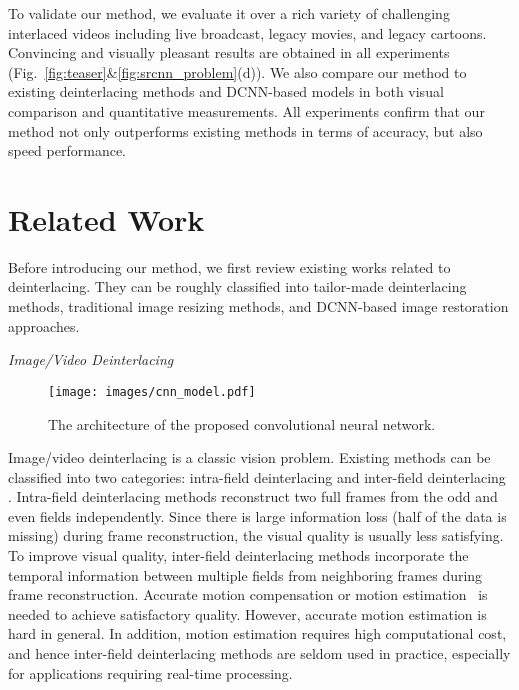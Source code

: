 \documentclass[acmtog]{acmart}
\begin{document}
To validate our method, we evaluate it over a rich
variety of challenging interlaced videos including live broadcast, legacy movies,
and legacy cartoons. Convincing and visually pleasant results are obtained in all experiments 
(Fig.~\ref{fig:teaser}\&\ref{fig:srcnn_problem}(d)). We also compare our
method to existing deinterlacing methods and DCNN-based models in both visual comparison and quantitative
measurements. All experiments confirm that our method not
only outperforms existing methods in terms of accuracy, but also
speed performance. 

\section{Related Work}
Before introducing our method, we first review existing works related to 
deinterlacing. They can be roughly classified into tailor-made 
deinterlacing methods,  traditional image resizing methods, and DCNN-based
image restoration approaches.

\vspace{0.15in}\noindent\emph{Image/Video Deinterlacing}\,\,\,\,\begin{figure*}[!tp]
  \texttt{[image: images/cnn\_model.pdf]}\\
  \caption{The architecture of the proposed convolutional neural network.}\label{fig:cnn_model}
\end{figure*}
Image/video deinterlacing is a classic  vision problem. 
Existing methods can be classified into two categories: intra-field deinterlacing
\cite{doyle1990interlaced,wang2012efficient,wang2013moving} and inter-field
deinterlacing \cite{jeon2009weighted,mohammadi2012enhanced,lee2013high}. 
Intra-field deinterlacing methods reconstruct two full frames from the odd and even fields
independently. Since
there is large information loss (half of the data is missing) during frame
reconstruction, the visual quality is usually less satisfying. To improve visual
quality, inter-field deinterlacing methods incorporate the temporal
information between multiple fields from neighboring frames during frame
reconstruction. Accurate motion compensation or motion
estimation~\cite{horn1981determining} is needed to achieve satisfactory quality. However, 
accurate motion estimation is hard in general. In
addition, motion estimation requires high computational cost, and hence inter-field
deinterlacing methods are seldom used in practice, especially for applications
requiring real-time processing.
\end{document}
